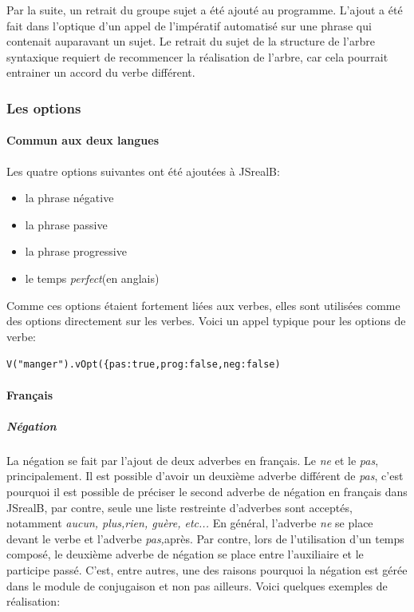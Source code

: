 \documentclass[11pt]{article} %
\newcommand{\system}[1]{\textsf{#1}}
\newcommand{\JSB}{\system{JSrealB}}
\begin{document}
Par la suite, un retrait du groupe sujet a été ajouté au programme.
L'ajout a été fait dans l'optique d'un appel de l'impératif automatisé
sur une phrase qui contenait auparavant un sujet. Le retrait du sujet
de la structure de l'arbre syntaxique requiert de recommencer la réalisation
de l'arbre, car cela pourrait entrainer un accord du verbe différent.

\subsubsection{Les options}
\label{vOptions}
\paragraph{Commun aux deux langues}
Les quatre options suivantes ont été ajoutées à \JSB{}:
\begin{itemize}
\item la phrase négative
\item la phrase passive
\item la phrase progressive
\item le temps \emph{perfect}(en anglais)
\end{itemize} 
Comme ces options étaient fortement liées aux verbes, elles sont utilisées
comme des options directement sur les verbes. Voici un appel typique pour les options de verbe: 
\begin{alltt}
{V("manger").vOpt(\{pas:true,prog:false,neg:false)}
\end{alltt}

\paragraph{Français}

\subparagraph{Négation}

La négation se fait par l'ajout de deux adverbes en français. Le \emph{ne}
et le \emph{pas}, principalement. Il est possible d'avoir un
deuxième adverbe différent de \emph{pas}, c'est pourquoi il est possible
de préciser le second adverbe de négation en français dans \JSB{},
par contre, seule une liste restreinte d'adverbes sont acceptés, notamment
\emph{aucun, plus,rien, guère, etc... }En général, l'adverbe
\emph{ne }se place devant le verbe et l'adverbe \emph{pas,}après.
Par contre, lors de l'utilisation d'un temps composé, le deuxième
adverbe de négation se place entre l'auxiliaire et le participe passé.
C'est, entre autres, une des raisons pourquoi la négation est gérée
dans le module de conjugaison et non pas ailleurs. Voici quelques
exemples de réalisation:
\end{document}
